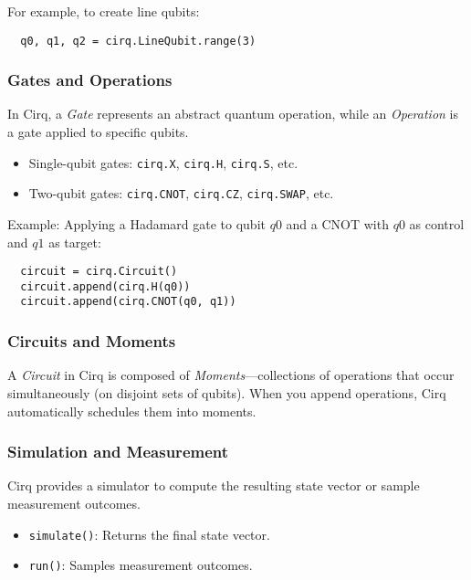 For example, to create line qubits:

\begin{verbatim}
  q0, q1, q2 = cirq.LineQubit.range(3)
\end{verbatim}

\subsubsection*{Gates and Operations}

In Cirq, a \emph{Gate} represents an abstract quantum operation, while an
\emph{Operation} is a gate applied to specific qubits.

\begin{itemize}
  \item Single-qubit gates: \texttt{cirq.X}, \texttt{cirq.H},
    \texttt{cirq.S}, etc.

  \item Two-qubit gates: \texttt{cirq.CNOT}, \texttt{cirq.CZ},
    \texttt{cirq.SWAP}, etc.

\end{itemize}

Example: Applying a Hadamard gate to qubit \(q0\) and a CNOT with \(q0\) as
control and \(q1\) as target:

\begin{verbatim}
  circuit = cirq.Circuit()
  circuit.append(cirq.H(q0))
  circuit.append(cirq.CNOT(q0, q1))
\end{verbatim}

\subsubsection*{Circuits and Moments}
A \emph{Circuit} in Cirq is composed of \emph{Moments}—collections of
operations that occur simultaneously (on disjoint sets of qubits). When you
append operations, Cirq automatically schedules them into moments.

\subsubsection*{Simulation and Measurement}

Cirq provides a simulator to compute the resulting state vector or sample
measurement outcomes.

\begin{itemize}
  \item \texttt{simulate()}: Returns the final state vector.

  \item \texttt{run()}: Samples measurement outcomes.
\end{itemize}


